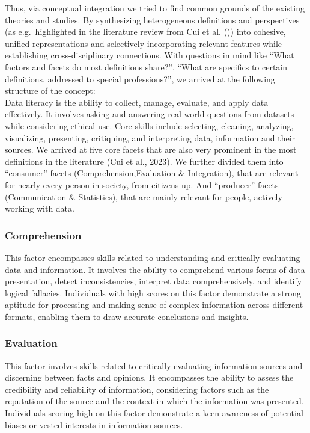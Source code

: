 \documentclass[
  12pt,
  a4paper,
  twoside]{article}
\begin{document}
Thus, via conceptual integration we tried to find common grounds of the existing theories and studies.
By synthesizing heterogeneous definitions and perspectives (as e.g.~highlighted in the literature review from Cui et al. ()) into cohesive, unified representations and selectively incorporating relevant features while establishing cross-disciplinary connections. With questions in mind like ``What factors and facets do most definitions share?'', ``What are specifics to certain definitions, addressed to special professions?'', we arrived at the following structure of the concept:\\
Data literacy is the ability to collect, manage, evaluate, and apply data effectively. It involves asking and answering real-world questions from datasets while considering ethical use. Core skills include selecting, cleaning, analyzing, visualizing, presenting, critiquing, and interpreting data, information and their sources.
We arrived at five core facets that are also very prominent in the most definitions in the literature (Cui et al., 2023). We further divided them into ``consumer'' facets (Comprehension,Evaluation \& Integration), that are relevant for nearly every person in society, from citizens up. And ``producer'' facets (Communication \& Statistics), that are mainly relevant for people, actively working with data.

\subsubsection{Comprehension}\label{comprehension}

This factor encompasses skills related to understanding and critically evaluating data and information. It involves the ability to comprehend various forms of data presentation, detect inconsistencies, interpret data comprehensively, and identify logical fallacies. Individuals with high scores on this factor demonstrate a strong aptitude for processing and making sense of complex information across different formats, enabling them to draw accurate conclusions and insights.

\subsubsection{Evaluation}\label{evaluation}

This factor involves skills related to critically evaluating information sources and discerning between facts and opinions. It encompasses the ability to assess the credibility and reliability of information, considering factors such as the reputation of the source and the context in which the information was presented. Individuals scoring high on this factor demonstrate a keen awareness of potential biases or vested interests in information sources.
\end{document}
